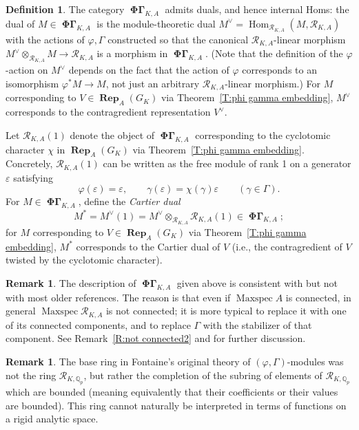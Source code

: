 \documentclass[12pt]{amsart}
\theoremstyle{definition}
\newtheorem{defn}[theorem]{Definition}
\newtheorem{remark}[theorem]{Remark}
\numberwithin{equation}{theorem}
\newcommand{\QQ}{\mathbb{Q}}
\newcommand{\calR}{\mathcal{R}}
\newcommand{\dual}{\vee}
\DeclareMathOperator{\Hom}{Hom}
\DeclareMathOperator{\Maxspec}{Maxspec}
\DeclareMathOperator{\PhiGamma}{\mathbf{\Phi \Gamma}}
\DeclareMathOperator{\Rep}{\mathbf{Rep}}
\begin{document}
\begin{defn}
The category $\PhiGamma_{K,A}$ admits duals, and hence internal Homs: the dual of $M \in \PhiGamma_{K,A}$ is the module-theoretic dual $M^\dual = \Hom_{\calR_{K,A}}(M, \calR_{K,A})$
with the actions of $\varphi, \Gamma$ constructed so that the canonical $\calR_{K,A}$-linear morphism $M^\dual \otimes_{\calR_{K,A}} M \to \calR_{K,A}$ is a morphism in $\PhiGamma_{K,A}$. (Note that the definition of the $\varphi$-action on $M^\dual$ depends on the fact that the action of $\varphi$ corresponds to an isomorphism $\varphi^*M \to M$, not just an arbitrary $\calR_{K,A}$-linear morphism.)
For $M$ corresponding to $V \in \Rep_A(G_K)$ via Theorem~\ref{T:phi gamma embedding}, $M^\dual$ corresponds to the contragredient representation $V^\dual$.

Let $\calR_{K, A}(1)$ denote the object of $\PhiGamma_{K, A}$ corresponding to the cyclotomic character $\chi$ in $\Rep_A(G_K)$ via Theorem~\ref{T:phi gamma embedding}.
Concretely, $\calR_{K,A}(1)$ can be written as the free module of rank 1 on a generator $\varepsilon$ satisfying
\[
\varphi(\varepsilon) = \varepsilon, \qquad \gamma(\varepsilon) = \chi(\gamma) \varepsilon \qquad (\gamma \in \Gamma).
\]
For $M \in \PhiGamma_{K,A}$, define the \emph{Cartier dual}
\[
M^* = M^\dual(1) = M^\dual \otimes_{\calR_{K,A}} \calR_{K,A}(1) \in \PhiGamma_{K,A};
\]
for $M$ corresponding to $V \in \Rep_A(G_K)$ via Theorem~\ref{T:phi gamma embedding}, $M^*$ corresponds to the Cartier dual of $V$ (i.e., the contragredient of $V$ twisted by the cyclotomic character).
\end{defn}



\begin{remark} \label{R:not connected}
The description of $\PhiGamma_{K,A}$ given above is consistent with \cite{kedlaya-new-phigamma} but not with most older references. The reason is that even if $\Maxspec A$ is connected, in general $\Maxspec \calR_{K,A}$ is not connected; it is more typical to replace it with one of its connected components, and to replace $\Gamma$ with the stabilizer of that component.
See Remark~\ref{R:not connected2} and \cite[Remark~2.2.12]{kedlaya-new-phigamma} for further discussion.
\end{remark}

\begin{remark}
The base ring in Fontaine's original theory of $(\varphi, \Gamma)$-modules was not the ring $\calR_{K, \QQ_p}$, but rather the completion of the subring of elements of $\calR_{K, \QQ_p}$
which are bounded (meaning equivalently that their coefficients or their values are bounded).
This ring cannot naturally be interpreted in terms of functions on a rigid analytic space.
\end{remark}
\end{document}
